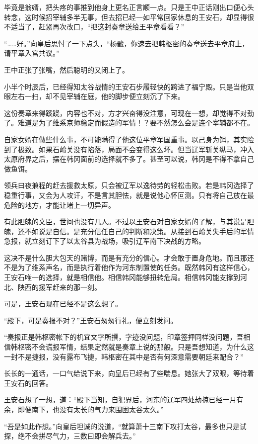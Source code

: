 毕竟是翁婿，把头疼的事推到他身上更名正言顺一点。只是王中正话刚出口便心头转念，这时候招宰辅多半无事，但去招已经一如平常回家休息的王安石，却显得很不适当了，赶紧再次改口，“把这封奏章送给王平章看看？”

“……好。”向皇后思忖了一下点头，“杨戬，你速去把韩枢密的奏章送去平章府上，请平章入宫共议。”

王中正张了张嘴，然后聪明的又闭上了。

小半个时辰后，已经得知太谷战情的王安石步履轻快的跨进了福宁殿。只是当他双眼左右一扫，却不见宰辅在庭，他的脚步便立刻沉了下来。

这份奏章来得蹊跷，内容也不对，方才兴奋得没注意，可现在一想，却觉得不对劲了。难道是为了维系京师稳定而假造的军情！？要不然怎么会是连个宰辅都不在。

自家女婿在做些什么事，不可能瞒得了他这位平章军国重事。以己身为饵，其实险到了极致。如果石岭关没有陷落，局面不会变得这么坏。但当辽军斩关纵马，冲入太原府界之后，摆在韩冈面前的选择就不多了。甚至可以说，韩冈是不得不拿自己做鱼饵。

领兵曰夜兼程的赶去援救太原，只会被辽军以逸待劳的轻松击败。若是韩冈选择了稳重行事，又会为人攻讦，不是言其胆怯，就是说他心怀叵测。只有将自己放在最危险的地方，才能让堵上一切异声。

有此胆魄的文臣，世间也没有几人。不过以王安石对自家女婿的了解，与其说是胆魄，还不如说是自信。是充分信任自己的判断和决策。从接到石岭关失手后的军情急报，就立刻订下了以太谷县为战场，吸引辽军南下决战的方略。

这决不是什么胆大包天的赌博，而是有充分的信心。才会敢于置身危地。而且那还不是为了维系声名，而是执行着他作为河东制置使的任务。既然韩冈有这样信心，王安石唯一的选择，就是相信他。相信韩冈能够扭转危局。相信韩冈能支撑到河北、陕西的援军赶来的那一刻。

可是，王安石现在已经不是这么想了。

“殿下，可是奏报不对？”王安石匆匆行礼，便立刻发问。

“奏报正是韩枢密帐下的机宜文字所撰，字迹没问题，印章签押同样没问题，吾相信韩枢密不会谎报军情，结果定然就是奏章上说的那般。只是吾想知道，为什么这一封不是捷报，没有露布飞捷，韩枢密在其中是否有何深意需要朝廷来配合？”

长长的一通话，一口气给说下来，向皇后已经有了些喘息。她张大了双眼，等待着王安石的回答。

王安石想了一想，道：“殿下当知，自犯界后，河东的辽军四处劫掠已经一月有余，即便南下，也没有太长的气力来围困太谷太久。”

“吾是如此作想。”向皇后坦诚的说道，“就算萧十三南下攻打太谷，最多也只是试探，绝不会拼尽气力，三数曰即会解兵去。”

